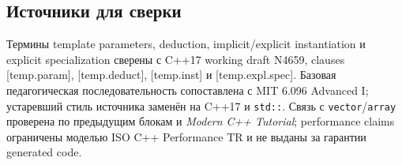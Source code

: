 \subsection{Источники для сверки}

Термины template parameters, deduction, implicit/explicit instantiation и
explicit specialization сверены с C++17 working draft N4659, clauses
[temp.param], [temp.deduct], [temp.inst] и [temp.expl.spec]. Базовая
педагогическая последовательность сопоставлена с MIT 6.096 Advanced I;
устаревший стиль источника заменён на C++17 и \texttt{std::}. Связь с
\texttt{vector}/\texttt{array} проверена по предыдущим блокам и
\textit{Modern C++ Tutorial}; performance claims ограничены моделью ISO C++
Performance TR и не выданы за гарантии generated code.
